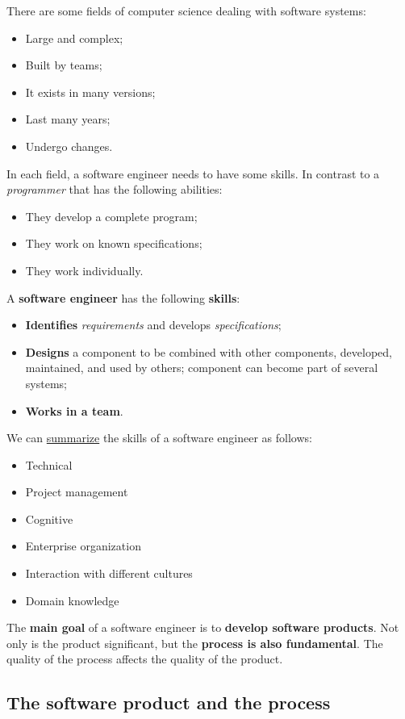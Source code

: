 There are some fields of computer science dealing with software systems:
\begin{itemize}
    \item Large and complex;
    \item Built by teams;
    \item It exists in many versions;
    \item Last many years;
    \item Undergo changes.
\end{itemize}
In each field, a software engineer needs to have some skills. In contrast to a \emph{programmer} that has the following abilities:
\begin{itemize}
    \item They develop a complete program;
    \item They work on known specifications;
    \item They work individually.
\end{itemize}
A \textbf{software engineer} has the following \textbf{skills}:
\begin{itemize}
    \item \textbf{Identifies} \emph{requirements} and develops \emph{specifications};
    \item \textbf{Designs} a component to be combined with other components, developed, maintained, and used by others; component can become part of several systems;
    \item \textbf{Works in a team}.
\end{itemize}
We can \underline{summarize} the skills of a software engineer as follows:
\begin{itemize}
    \item Technical
    \item Project management
    \item Cognitive
    \item Enterprise organization
    \item Interaction with different cultures
    \item Domain knowledge
\end{itemize}
The \textbf{main goal} of a software engineer is to \textbf{develop software products}. Not only is the product significant, but the \textbf{process is also fundamental}. The quality of the process affects the quality of the product.

\newpage

\subsection{The software product and the process}

